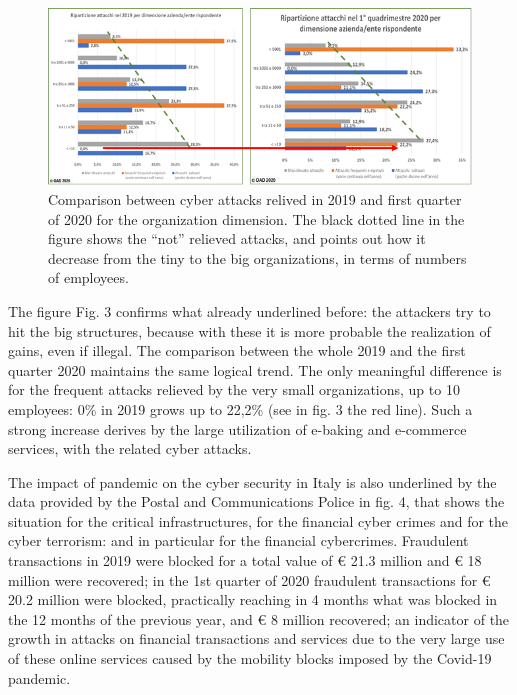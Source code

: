 \documentclass{easychair}
\begin{document}
\begin{figure}
	\centering
		\includegraphics[width=1\textwidth]{pictures/fig3.png}
		\caption{Comparison between cyber attacks relived in 2019 and first quarter of 2020 for the organization dimension. The black dotted line in the figure shows 
the “not” relieved attacks, and points out how it decrease from the tiny to the big organizations, in terms of numbers of employees. }
		\label{fig:3}
\end{figure}

The figure Fig. 3 confirms what already underlined before: the attackers try to hit the big structures, because with these it is more probable the realization of gains, even if illegal.
The comparison between the whole 2019 and the first quarter 2020 maintains the same logical trend. The only meaningful difference is for the frequent attacks relieved by the very
small organizations, up to 10 employees: 0\% in 2019 grows up to 22,2\% (see in fig. 3 the red line). Such a strong increase derives by the large utilization of e-baking and 
e-commerce services, with the related cyber attacks.

The impact of pandemic on the cyber security in Italy is also underlined by the data provided by the Postal and Communications Police in fig. 4, that shows the situation for the
critical infrastructures, for the financial cyber crimes and for the cyber terrorism: and in particular for the financial cybercrimes. Fraudulent transactions in 2019 were blocked
for a total value of € 21.3 million and € 18 million were recovered; in the 1st quarter of 2020 fraudulent transactions for € 20.2 million were blocked, practically 
reaching in 4 months what was blocked in the 12 months of the previous year, and € 8 million recovered; an indicator of the growth in attacks on financial transactions and 
services due to the very large use of these online services caused by the mobility blocks imposed by the Covid-19 pandemic.
\end{document}
